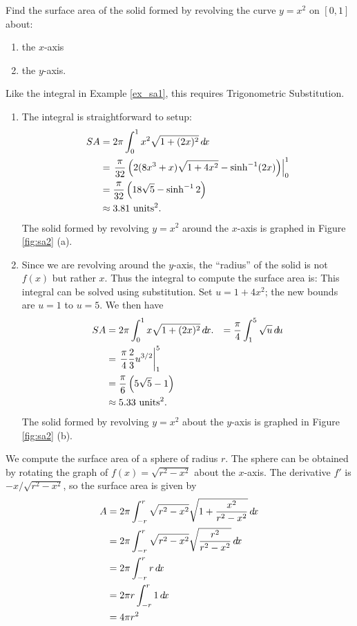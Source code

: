 \documentclass{ximera}
\begin{document}
\begin{example}
Find the surface area of the solid formed by revolving the curve
$y=x^2$ on $[0,1]$ about:
		\begin{enumerate}
		\item		the $x$-axis
		\item		the $y$-axis.
		\end{enumerate}
                Like the integral in Example \ref{ex_sa1}, this requires Trigonometric Substitution.
\begin{enumerate}
	\item		The integral is straightforward to setup:
	\begin{align*}
	SA &= 2\pi\int_0^1 x^2\sqrt{1+(2x)^2}\mathop{}\!d\! x\\
		&= \left.\frac{\pi}{32}\left(2(8x^3+x)\sqrt{1+4x^2}-\sinh^{-1}(2x)\right)\right|_0^1\\
		&=\frac{\pi}{32}\left(18\sqrt{5}-\sinh^{-1}2\right)\\
		&\approx 3.81\ \text{units}^2.
	\end{align*}
	The solid formed by revolving $y=x^2$ around the $x$-axis is graphed in Figure \ref{fig:sa2} (a).
	
	\item	 Since we are revolving around the $y$-axis, the ``radius'' of the solid is not $f(x)$ but rather $x$. Thus the integral to compute the surface area is: This integral can be solved using substitution. Set $u=1+4x^2$; the new bounds are $u=1$ to $u=5$. We then have 
	\begin{align*}
	SA &= 2\pi\int_0^1x\sqrt{1+(2x)^2}\mathop{}\!d\! x.
		&=	\frac{\pi}4\int_1^5 \sqrt{u}\mathop{}\!d\! u \\
		&= \left.\frac{\pi}{4}\frac23 u^{3/2}\right|_1^5\\
		&= \frac{\pi}6\left(5\sqrt{5}-1\right)\\
		&\approx 5.33\ \text{units}^2.
	\end{align*}
 The solid formed by revolving $y=x^2$ about the $y$-axis is graphed in Figure \ref{fig:sa2} (b).	
\end{enumerate}

\end{example}




\begin{example}
  We compute the surface area of a sphere of radius $r$.  The sphere
  can be obtained by rotating the graph of $f(x)=\sqrt{r^2 - x^2}$
  about the $x$-axis.  The derivative $f'$ is $-x/\sqrt{r^2-x^2}$,
  so the surface area is given by
  \begin{align*}
    A&=2\pi \int_{-r }^r \sqrt{r^2 - x^2}\sqrt{1+\frac{x^2}{r^2-x^2}}\d x \\
    &=2\pi \int_{-r }^r \sqrt{r^2 - x^2}\sqrt{\frac{r^2}{r^2-x^2}}\d x \\
    &=2\pi \int_{-r }^r r\d x\\
    &=2\pi r\int_{-r }^r 1\d x\\
    &=4\pi r^2
  \end{align*}
\end{example}
\end{document}
